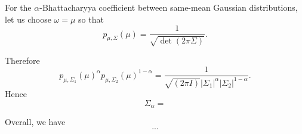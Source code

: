 \documentclass[11pt]{article}
\begin{document}
For the $\alpha$-Bhattacharyya coefficient  between same-mean Gaussian distributions, let us choose $\omega=\mu$ so that
$$
p_{\mu,\Sigma}(\mu)=\frac{1}{\sqrt{\det(2\pi\Sigma)}}.
$$

Therefore
$$
p_{\mu,\Sigma_1}(\mu)^\alpha p_{\mu,\Sigma_2}(\mu)^{1-\alpha}=\frac{1}{\sqrt{(2\pi I)} |\Sigma_1|^\alpha |\Sigma_2|^{1-\alpha}}.
$$
Hence 
$$
\Sigma_\alpha=
$$

Overall, we have
$$
...
$$





\end{document}
